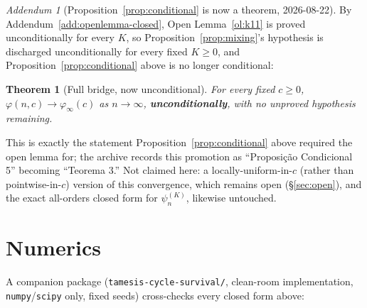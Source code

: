 \documentclass[11pt]{article}
\newtheorem{theorem}{Theorem}
\theoremstyle{remark}
\newtheorem{addendum}{Addendum}
\newcommand{\phiinf}{\varphi_\infty}
\begin{document}
\begin{addendum}[Proposition~\ref{prop:conditional} is now a theorem, 2026-08-22]
\label{add:fullbridge-closed}
By Addendum~\ref{add:openlemma-closed}, Open Lemma~\ref{ol:k11} is
proved unconditionally for every $K$, so Proposition~\ref{prop:mixing}'s
hypothesis is discharged unconditionally for every fixed $K\ge0$, and
Proposition~\ref{prop:conditional} above is no longer conditional:

\begin{theorem}[Full bridge, now unconditional]
\label{thm:fullbridge}
For every fixed $c\ge0$, $\varphi(n,c)\to\phiinf(c)$ as $n\to\infty$,
\textbf{unconditionally}, with no unproved hypothesis remaining.
\end{theorem}

\noindent This is exactly the statement Proposition~\ref{prop:conditional}
above required the open lemma for; the archive records this promotion
as ``Proposi\c{c}\~ao Condicional 5'' becoming ``Teorema 3.'' Not
claimed here: a locally-uniform-in-$c$ (rather than pointwise-in-$c$)
version of this convergence, which remains open (\S\ref{sec:open}), and
the exact all-orders closed form for $\psi_n^{(K)}$, likewise untouched.
\end{addendum}

\section{Numerics}
\label{sec:numerics}

A companion package (\texttt{tamesis-cycle-survival/}, clean-room
implementation, \texttt{numpy}/\texttt{scipy} only, fixed seeds)
cross-checks every closed form above:
\end{document}
